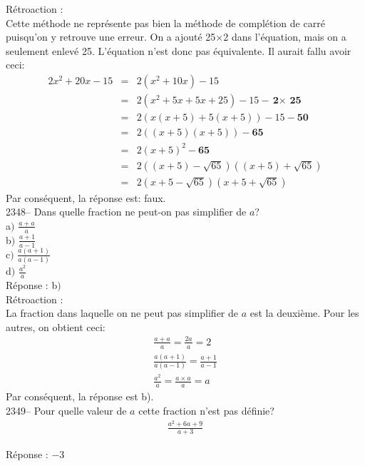 \documentclass[letterpaper, 12pt]{article}
\begin{document}
R\'etroaction :\\
Cette m\'ethode ne repr\'esente pas bien la m\'ethode de compl\'etion de carr\'e puisqu'on y retrouve une erreur. On a ajout\'e 25$\times$2 dans l'\'equation, mais on a seulement enlev\'e 25. L'\'equation n'est donc pas \'equivalente. Il aurait fallu avoir ceci:
\begin{eqnarray*}
2x^{2}+20x-15 &=& 2(x^{2}+10x)-15  \\
&=& 2(x^{2}+5x+5x+25)-15-\textbf{2$\times$ 25}\\
&=& 2(x(x+5)+5(x+5))-15-\textbf{50}\\
&=& 2((x+5)(x+5))-\textbf{65}\\
&=& 2(x+5)^{2}-\textbf{65}\\
&=& 2((x+5)-\textbf{$\sqrt{65}$})((x+5)+\textbf{$\sqrt{65}$})\\
&=& 2(x+5-\textbf{$\sqrt{65}$})(x+5+\textbf{$\sqrt{65}$})
\end{eqnarray*}
Par cons\'equent, la r\'eponse est: faux.\\

2348-- Dans quelle fraction ne peut-on pas simplifier de $a$?\\

a$)$ $\frac{a+a}{a}$\\[2mm]
b$)$ $\frac{a+1}{a-1}$\\[2mm]
c$)$ $\frac{a(a+1)}{a(a-1)}$\\[2mm]
d$)$ $\frac{a^{2}}{a}$\\

R\'eponse : b$)$\\

R\'etroaction :\\
La fraction dans laquelle on ne peut pas simplifier de $a$ est la deuxi\`eme. Pour les autres, on obtient ceci:
\begin{eqnarray*}
 \frac{a+a}{a}=\frac{2a}{a}=2\\[2mm]
 \frac{a(a+1)}{a(a-1)}=\frac{a+1}{a-1}\\[2mm]
 \frac{a^{2}}{a}=\frac{a\times a}{a}= a
\end{eqnarray*}
Par cons\'equent, la r\'eponse est b).\\

2349--  Pour quelle valeur de $a$ cette fraction n'est pas d\'efinie?\\
\begin{eqnarray*}
\frac{a^{2}+6a+9}{a+3}
\end{eqnarray*}

R\'eponse : $-3$\\
\end{document}
